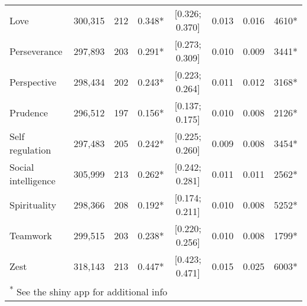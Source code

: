 \documentclass[
  man,floatsintext]{apa6}
\begin{document}
\begin{table}
\begin{tabular}[t]{lccccccc}
Love & 300,315 & 212 & 0.348* & {}[0.326; 0.370] & 0.013 & 0.016 & 4610*\\
Perseverance & 297,893 & 203 & 0.291* & {}[0.273; 0.309] & 0.010 & 0.009 & 3441*\\
Perspective & 298,434 & 202 & 0.243* & {}[0.223; 0.264] & 0.011 & 0.012 & 3168*\\
Prudence & 296,512 & 197 & 0.156* & {}[0.137; 0.175] & 0.010 & 0.008 & 2126*\\
Self regulation & 297,483 & 205 & 0.242* & {}[0.225; 0.260] & 0.009 & 0.008 & 3454*\\
\addlinespace
Social intelligence & 305,999 & 213 & 0.262* & {}[0.242; 0.281] & 0.011 & 0.011 & 2562*\\
Spirituality & 298,366 & 208 & 0.192* & {}[0.174; 0.211] & 0.010 & 0.008 & 5252*\\
Teamwork & 299,515 & 203 & 0.238* & {}[0.220; 0.256] & 0.010 & 0.008 & 1799*\\
Zest & 318,143 & 213 & 0.447* & {}[0.423; 0.471] & 0.015 & 0.025 & 6003*\\
\bottomrule
\multicolumn{8}{l}{\textsuperscript{*} See the shiny app for additional info}\\
\end{tabular}
\end{table}
\end{document}
